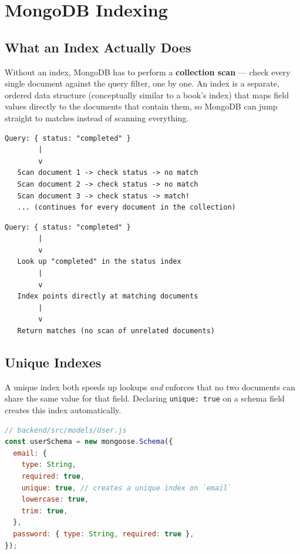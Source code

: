 \chapter{MongoDB Indexing}

\section{What an Index Actually Does}

Without an index, MongoDB has to perform a \textbf{collection scan} --- check
every single document against the query filter, one by one. An index is a
separate, ordered data structure (conceptually similar to a book's index)
that maps field values directly to the documents that contain them, so
MongoDB can jump straight to matches instead of scanning everything.

\begin{diagrambox}
\begin{verbatim}
Query: { status: "completed" }
        |
        v
   Scan document 1 -> check status -> no match
   Scan document 2 -> check status -> no match
   Scan document 3 -> check status -> match!
   ... (continues for every document in the collection)
\end{verbatim}
\end{diagrambox}

\begin{diagrambox}
\begin{verbatim}
Query: { status: "completed" }
        |
        v
   Look up "completed" in the status index
        |
        v
   Index points directly at matching documents
        |
        v
   Return matches (no scan of unrelated documents)
\end{verbatim}
\end{diagrambox}

\section{Unique Indexes}

A unique index both speeds up lookups \emph{and} enforces that no two
documents can share the same value for that field. Declaring
\texttt{unique: true} on a schema field creates this index automatically.

\begin{lstlisting}[language=JavaScript]
// backend/src/models/User.js
const userSchema = new mongoose.Schema({
  email: {
    type: String,
    required: true,
    unique: true, // creates a unique index on `email`
    lowercase: true,
    trim: true,
  },
  password: { type: String, required: true },
});
\end{lstlisting}

